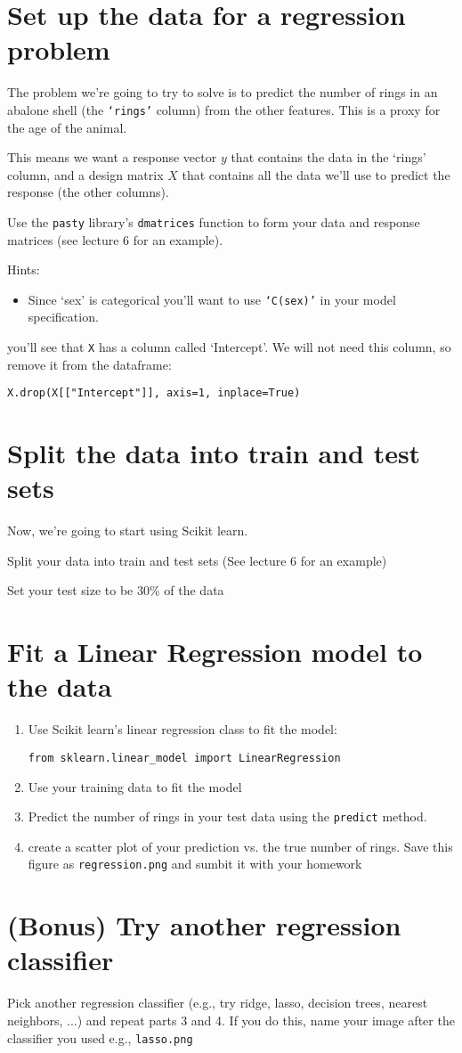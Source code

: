 \documentclass{article}
\begin{document}
\section{Set up the data for a regression problem}

The problem we're going to try to solve is to predict the number of rings in an abalone shell (the {\tt `rings'} column) from the other features. This is a proxy for the age of the animal.

This means we want a response vector $y$ that contains the data in the `rings' column, and a design matrix $X$ that contains all the data we'll use to predict the response (the other columns).

Use the {\tt pasty} library's {\tt dmatrices} function to form your data and response matrices (see lecture 6 for an example).

Hints:
\begin{itemize}
\item Since `sex' is categorical you'll want to use {\tt `C(sex)'} in your model specification.
\end{itemize}

you'll see that {\tt X} has a column called `Intercept'.  We will not need this column, so remove it from the dataframe:

{\tt X.drop(X[["Intercept"]], axis=1, inplace=True)}

\section{Split the data into train and test sets}

Now, we're going to start using Scikit learn.

Split your data into train and test sets (See lecture 6 for an example)

Set your test size to be 30\% of the data

\section{Fit a Linear Regression model to the data}

\begin{enumerate}
\item Use Scikit learn's linear regression class to fit the model:

{\tt from sklearn.linear\_model import LinearRegression}
\item Use your training data to fit the model
\item Predict the number of rings in your test data using the {\tt predict} method.
\item create a scatter plot of your prediction vs. the true number of rings.  Save this figure as {\tt regression.png} and sumbit it with your homework
\end{enumerate}

\section{(Bonus) Try another regression classifier}

Pick another regression classifier (e.g., try ridge, lasso, decision trees, nearest neighbors, ...) and repeat parts 3 and 4.  If you do this, name your image after the classifier you used e.g., {\tt lasso.png}
\end{document}
